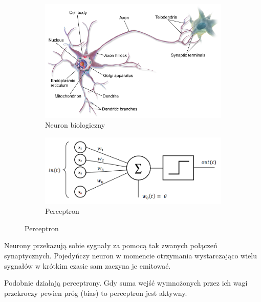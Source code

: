 \documentclass{article}
\begin{document}
\begin{figure}[H]
    \centering
    \begin{subfigure}{0.7\linewidth}
        \includegraphics[width=\linewidth]{images/neuron.png}
        \caption{Neuron biologiczny\cite{neuron-image}}
    \end{subfigure}
    \begin{subfigure}{0.7\linewidth}
        \includegraphics[width=\linewidth]{images/perceptron.png}
        \caption{Perceptron\cite{perceptron-image}}
    \end{subfigure}
\end{figure}
Neurony przekazują sobie sygnały za pomocą tak zwanych połączeń synaptycznych.
Pojedyńczy neuron w momencie otrzymania wystarczająco wielu sygnałów w krótkim czasie sam zaczyna je emitować.

Podobnie działają perceptrony.
Gdy suma wejść wymnożonych przez ich wagi przekroczy pewien próg (bias) to perceptron jest aktywny.
\end{document}
